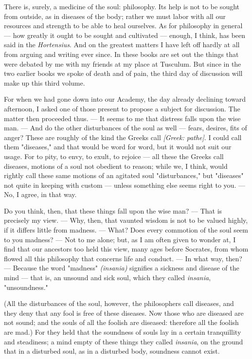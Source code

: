  There is, surely, a medicine of the soul: philosophy. Its help is not to be sought from outside, as in diseases of the body; rather we must labor with all our resources and strength to be able to heal ourselves. As for philosophy in general — how greatly it ought to be sought and cultivated — enough, I think, has been said in the \textit{Hortensius}. And on the greatest matters I have left off hardly at all from arguing and writing ever since. In these books are set out the things that were debated by me with my friends at my place at Tusculum. But since in the two earlier books we spoke of death and of pain, the third day of discussion will make up this third volume.

 For when we had gone down into our Academy, the day already declining toward afternoon, I asked one of those present to propose a subject for discussion. The matter then proceeded thus. — It seems to me that distress falls upon the wise man. — And do the other disturbances of the soul as well — fears, desires, fits of anger? These are roughly of the kind the Greeks call \textit{[Greek: pathe]}. I could call them "diseases," and that would be word for word, but it would not suit our usage. For to pity, to envy, to exult, to rejoice — all these the Greeks call diseases, motions of a soul not obedient to reason; while we, I think, would rightly call these same motions of an agitated soul "disturbances," but "diseases" not quite in keeping with custom — unless something else seems right to you. — No, I agree, in that way.

 Do you think, then, that these things fall upon the wise man? — That is precisely my view. — Why, then, that vaunted wisdom is not to be valued highly, if it differs little from madness. — What? Does every commotion of the soul seem to you madness? — Not to me alone; but, as I am often given to wonder at, I find that our ancestors too held this view, many ages before Socrates, from whom flowed all this philosophy that concerns life and conduct. — In what way, then? — Because the word "madness" \textit{(insania)} signifies a sickness and disease of the mind — that is, an unsound and sick soul, which they called \textit{insania}, "unsoundness."

 (All the disturbances of the soul, however, the philosophers call diseases, and they deny that any fool is free of these diseases. Now those who are diseased are not sound; and the souls of all the foolish are diseased: therefore all the foolish are mad.) For they held that the soundness of souls lay in a certain tranquillity and steadiness; a mind empty of these things they called \textit{insania}, on the ground that in a disturbed soul, as in a disturbed body, soundness cannot exist.

